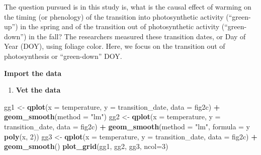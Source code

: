 \documentclass[]{book}
\newenvironment{Shaded}{\begin{snugshade}}{\end{snugshade}}
\newcommand{\CommentTok}[1]{\textcolor[rgb]{0.56,0.35,0.01}{\textit{#1}}}
\newcommand{\DataTypeTok}[1]{\textcolor[rgb]{0.13,0.29,0.53}{#1}}
\newcommand{\DecValTok}[1]{\textcolor[rgb]{0.00,0.00,0.81}{#1}}
\newcommand{\KeywordTok}[1]{\textcolor[rgb]{0.13,0.29,0.53}{\textbf{#1}}}
\newcommand{\NormalTok}[1]{#1}
\newcommand{\OperatorTok}[1]{\textcolor[rgb]{0.81,0.36,0.00}{\textbf{#1}}}
\newcommand{\StringTok}[1]{\textcolor[rgb]{0.31,0.60,0.02}{#1}}
\providecommand{\tightlist}{%
  \setlength{\itemsep}{0pt}\setlength{\parskip}{0pt}}
\begin{document}
The question pursued is in this study is, what is the causal effect of warming on the timing (or phenology) of the transition into photosynthetic activity (``green-up'') in the spring and of the transition out of photosynthetic activity (``green-down'') in the fall? The researchers measured these transition dates, or Day of Year (DOY), using foliage color. Here, we focus on the transition out of photosynthesis or ``green-down'' DOY.

\textbf{Import the data}

\begin{Shaded}
\end{Shaded}

\begin{enumerate}
\def\labelenumi{\arabic{enumi}.}
\tightlist
\item
  \textbf{Vet the data}
\end{enumerate}

\begin{Shaded}
\begin{Highlighting}[]
\NormalTok{gg1 <-}\StringTok{ }\KeywordTok{qplot}\NormalTok{(}\DataTypeTok{x =}\NormalTok{ temperature,}
      \DataTypeTok{y =}\NormalTok{ transition_date,}
      \DataTypeTok{data =}\NormalTok{ fig2c) }\OperatorTok{+}
\StringTok{  }\KeywordTok{geom_smooth}\NormalTok{(}\DataTypeTok{method =} \StringTok{"lm"}\NormalTok{)}
\NormalTok{gg2 <-}\StringTok{ }\KeywordTok{qplot}\NormalTok{(}\DataTypeTok{x =}\NormalTok{ temperature,}
      \DataTypeTok{y =}\NormalTok{ transition_date,}
      \DataTypeTok{data =}\NormalTok{ fig2c) }\OperatorTok{+}
\StringTok{  }\KeywordTok{geom_smooth}\NormalTok{(}\DataTypeTok{method =} \StringTok{"lm"}\NormalTok{, }\DataTypeTok{formula =}\NormalTok{ y }\OperatorTok{~}\StringTok{ }\KeywordTok{poly}\NormalTok{(x, }\DecValTok{2}\NormalTok{))}
\NormalTok{gg3 <-}\StringTok{ }\KeywordTok{qplot}\NormalTok{(}\DataTypeTok{x =}\NormalTok{ temperature,}
      \DataTypeTok{y =}\NormalTok{ transition_date,}
      \DataTypeTok{data =}\NormalTok{ fig2c) }\OperatorTok{+}
\StringTok{  }\KeywordTok{geom_smooth}\NormalTok{()}
\KeywordTok{plot_grid}\NormalTok{(gg1, gg2, gg3, }\DataTypeTok{ncol=}\DecValTok{3}\NormalTok{)}
\end{Highlighting}
\end{Shaded}
\end{document}
